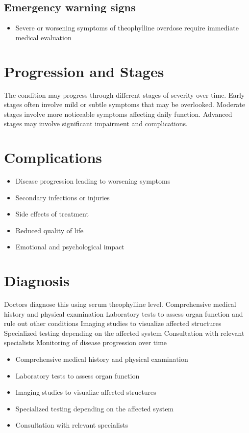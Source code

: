 \subsection{Emergency warning signs}
\begin{itemize}[noitemsep]
  \item Severe or worsening symptoms of theophylline overdose require immediate medical evaluation
\end{itemize}
\section{Progression and Stages}
The condition may progress through different stages of severity over time. Early stages often involve mild or subtle symptoms that may be overlooked. Moderate stages involve more noticeable symptoms affecting daily function. Advanced stages may involve significant impairment and complications.
\section{Complications}
\begin{itemize}[noitemsep]
  \item Disease progression leading to worsening symptoms
  \item Secondary infections or injuries
  \item Side effects of treatment
  \item Reduced quality of life
  \item Emotional and psychological impact
\end{itemize}
\section{Diagnosis}
Doctors diagnose this using serum theophylline level. Comprehensive medical history and physical examination Laboratory tests to assess organ function and rule out other conditions Imaging studies to visualize affected structures Specialized testing depending on the affected system Consultation with relevant specialists Monitoring of disease progression over time

\begin{itemize}[noitemsep]
  \item Comprehensive medical history and physical examination
  \item Laboratory tests to assess organ function
  \item Imaging studies to visualize affected structures
  \item Specialized testing depending on the affected system
  \item Consultation with relevant specialists
\end{itemize}
